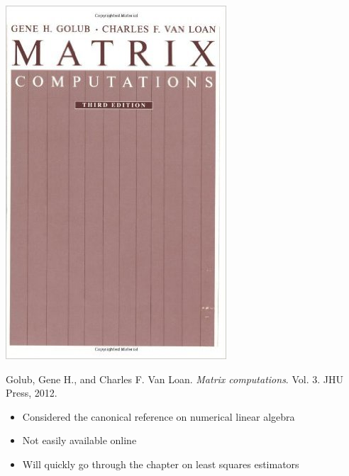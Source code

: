 \begin{frame}[fragile] \frametitle{}

\noindent
\begin{minipage}{0.5\textwidth}
\includegraphics[width=0.9\linewidth]{img/golub.jpg}
\end{minipage}%
\begin{minipage}{0.5\textwidth}
Golub, Gene H., and Charles F. Van Loan. {\it Matrix computations}. Vol. 3. JHU Press, 2012. \\
\begin{itemize}
\item Considered the canonical reference on numerical linear algebra
\item Not easily available online
\item Will quickly go through the chapter on least squares estimators
\end{itemize}
\end{minipage}

\end{frame}

